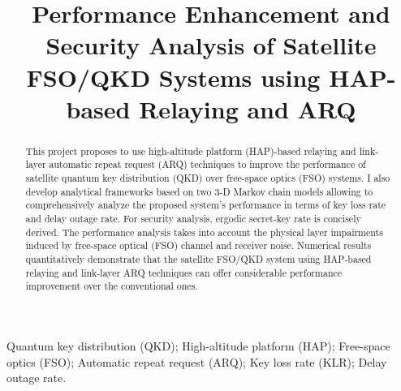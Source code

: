 \documentclass[conference]{IEEEtran}
\begin{document}
\title{Performance Enhancement and Security Analysis of Satellite FSO/QKD Systems using HAP-based Relaying and ARQ
}

\author{
}

\maketitle
\begin{abstract}
This project proposes to use high-altitude platform (HAP)-based relaying and link-layer automatic repeat request (ARQ) techniques to improve the performance of satellite quantum key distribution (QKD) over free-space optics (FSO) systems. I also develop analytical frameworks based on two 3-D Markov chain models allowing to comprehensively analyze the proposed system's performance in terms of key loss rate and delay outage rate. For security analysis, ergodic secret-key rate is concisely derived. The performance analysis takes into account the physical layer impairments induced by free-space optical (FSO) channel and receiver noise. Numerical results quantitatively demonstrate that the satellite FSO/QKD system using HAP-based relaying and link-layer ARQ techniques can offer considerable performance improvement over the conventional ones. 
\end{abstract}

\renewcommand\IEEEkeywordsname{Keywords}
\begin{IEEEkeywords}
Quantum key distribution (QKD); High-altitude platform (HAP); Free-space optics (FSO); Automatic repeat request (ARQ); Key loss rate (KLR); Delay outage rate.
\end{IEEEkeywords}

\IEEEpeerreviewmaketitle

\end{document}
